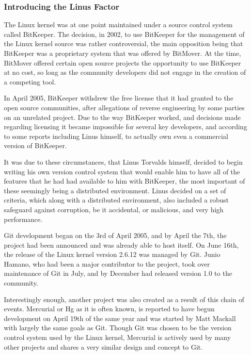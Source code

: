 \subsubsection{Introducing the Linus Factor}
The Linux kernel was at one point maintained under a source control system called BitKeeper.
The decision, in 2002, to use BitKeeper for the management of the Linux kernel source was rather controversial, the main opposition being that BitKeeper was a proprietary system that was offered by BitMover.
At the time, BitMover offered certain open source projects the opportunity to use BitKeeper at no cost, so long as the community developers did not engage in the creation of a competing tool.

In April 2005, BitKeeper withdrew the free license that it had granted to the open source communities, after allegations of reverse engineering by some parties on an unrelated project.
Due to the way BitKeeper worked, and decisions made regarding licensing it became impossible for several key developers, and according to some reports including Linus himself, to actually own even a commercial version of BitKeeper.

It was due to these circumstances, that Linus Torvalds himself, decided to begin writing his own version control system that would enable him to have all of the features that he had had available to him with BitKeeper, the most important of these seemingly being a distributed environment.
Linus decided on a set of criteria, which along with a distributed environment, also included a robust safeguard against corruption, be it accidental, or malicious, and very high performance.

Git development began on the 3rd of April 2005, and by April the 7th, the project had been announced and was already able to host itself.
On June 16th, the release of the Linux kernel version 2.6.12 was managed by Git.
Junio Hamano, who had been a major contributor to the project, took over maintenance of Git in July, and by December had released version 1.0 to the community.

Interestingly enough, another project was also created as a result of this chain of events.
Mercurial or Hg as it is often known, is reported to have begun development on April 19th of the same year and was started by Matt Mackall with largely the same goals as Git.
Though Git was chosen to be the version control system used by the Linux kernel, Mercurial is actively used by many other projects and shares a very similar design and concept to Git.

